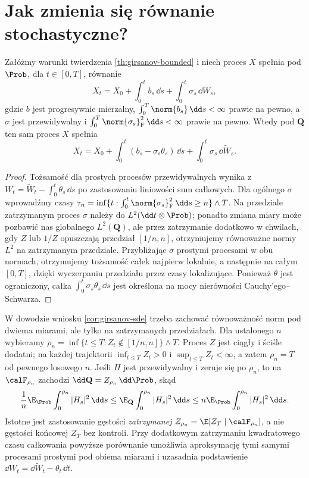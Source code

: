 \section{Jak zmienia się równanie stochastyczne?}

\begin{wniosek}
\label{cor:girsanov-sde}
Załóżmy warunki twierdzenia \ref{th:girsanov-bounded}
i niech proces $X$ spełnia pod $\Prob$, dla
$t\in[0,T]$, równanie
\[
X_t=X_0+\int_0^tb_s\,\dd s+\int_0^t\sigma_s\,\dd W_s,
\]
gdzie $b$ jest progresywnie mierzalny,
$\int_0^T\norm{b_s}\,\dd s<\infty$ prawie na pewno,
a $\sigma$ jest przewidywalny i
$\int_0^T\norm{\sigma_s}_{\mathrm F}^2\,\dd s<\infty$
prawie na pewno. Wtedy pod $\mathbf Q$ ten sam proces $X$
spełnia
\[
X_t=X_0+\int_0^t(b_s-\sigma_s\theta_s)\,\dd s
        +\int_0^t\sigma_s\,\dd\widetilde W_s.
\tag{8.8}\label{eq:girsanov-sde}
\]
\end{wniosek}
\begin{proof}
Tożsamość dla prostych procesów przewidywalnych wynika
z $W_t=\widetilde W_t-\int_0^t\theta_s\,\dd s$
po zastosowaniu liniowości sum całkowych.
Dla ogólnego $\sigma$ wprowadźmy czasy
$\tau_n=\inf\{t:\int_0^t\norm{\sigma_s}_{\mathrm F}^2\,\dd s\ge n\}\wedge T$.
Na przedziale zatrzymanym proces $\sigma$ należy do
$L^2(\dd t\otimes\Prob)$; ponadto zmiana miary może
pozbawić nas globalnego $L^2(\mathbf Q)$, ale przez
zatrzymanie dodatkowo w chwilach, gdy $Z$ lub $1/Z$
opuszczają przedział $[1/n,n]$, otrzymujemy równoważne
normy $L^2$ na zatrzymanym przedziale.
Przybliżając $\sigma$ prostymi procesami w obu normach,
otrzymujemy tożsamość całek najpierw lokalnie, a następnie
na całym $[0,T]$, dzięki wyczerpaniu przedziału przez
czasy lokalizujące. Ponieważ $\theta$ jest ograniczony,
całka $\int_0^t\sigma_s\theta_s\,\dd s$ jest określona
na mocy nierówności Cauchy'ego--Schwarza.
\end{proof}


\begin{uwaga}
W dowodzie wniosku \ref{cor:girsanov-sde} trzeba zachować
równoważność norm pod dwiema miarami, ale tylko na
zatrzymanych przedziałach. Dla ustalonego $n$ wybieramy
$\rho_n=\inf\{t\le T:Z_t\notin[1/n,n]\}\wedge T$.
Proces $Z$ jest ciągły i ściśle dodatni; na każdej trajektorii
$\inf_{t\le T}Z_t>0$ i $\sup_{t\le T}Z_t<\infty$,
a zatem $\rho_n=T$ od pewnego losowego $n$.
Jeśli $H$ jest przewidywalny i zeruje się po $\rho_n$,
to na $\calF_{\rho_n}$ zachodzi
$\dd\mathbf Q=Z_{\rho_n}\,\dd\Prob$, skąd
\[
  \frac1n\E_{\Prob}\int_0^{\rho_n}|H_s|^2\,\dd s
 \le \E_{\mathbf Q}\int_0^{\rho_n}|H_s|^2\,\dd s
 \le n\E_{\Prob}\int_0^{\rho_n}|H_s|^2\,\dd s.
\]
Istotne jest zastosowanie gęstości \emph{zatrzymanej}
$Z_{\rho_n}=\E[Z_T\mid\calF_{\rho_n}]$,
a nie gęstości końcowej $Z_T$ bez kontroli.
Przy dodatkowym zatrzymaniu kwadratowego czasu całkowania
powyższe porównanie umożliwia aproksymację tymi samymi
procesami prostymi pod obiema miarami i uzasadnia
podstawienie $\dd W_t=\dd\widetilde W_t-\theta_t\,\dd t$.
\end{uwaga}

